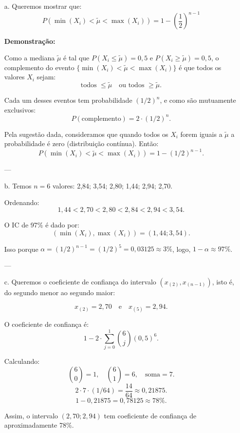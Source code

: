 \documentclass[12pt]{article}
\begin{document}
\begin{enumerate}
    \item[a.] Queremos mostrar que:
    \[
    P(\min(X_i) < \tilde{\mu} < \max(X_i)) = 1 - \left(\frac12\right)^{n-1}
    \]
    
    \textbf{Demonstração:}
    
    Como a mediana \(\tilde{\mu}\) é tal que \(P(X_i \leq \tilde{\mu})=0,5\) e \(P(X_i \geq \tilde{\mu})=0,5\), o complemento do evento \(\{\min(X_i) < \tilde{\mu} < \max(X_i)\}\) é que todos os valores \(X_i\) sejam:
    \[
    \text{todos } \leq \tilde{\mu} \quad \text{ou todos } \geq \tilde{\mu}.
    \]
    
    Cada um desses eventos tem probabilidade \((1/2)^n\), e como são mutuamente exclusivos:
    \[
    P(\text{complemento}) = 2 \cdot (1/2)^n.
    \]
    
    Pela sugestão dada, consideramos que quando todos os \(X_i\) forem iguais a \(\tilde{\mu}\) a probabilidade é zero (distribuição contínua). Então:
    \[
    P(\min(X_i) < \tilde{\mu} < \max(X_i)) = 1 - (1/2)^{n-1}.
    \]
    
    ---
    
    \item[b.] Temos \(n=6\) valores: 2,84; 3,54; 2,80; 1,44; 2,94; 2,70.
    
    Ordenando:
    \[
    1,44 < 2,70 < 2,80 < 2,84 < 2,94 < 3,54.
    \]
    
    O IC de 97\% é dado por:
    \[
    (\min(X_i), \max(X_i)) = (1,44; 3,54).
    \]
    
    Isso porque \(\alpha = (1/2)^{n-1} = (1/2)^5 = 0,03125 \approx 3\%\), logo, \(1-\alpha \approx 97\%\).
    
    ---
    
    \item[c.] Queremos o coeficiente de confiança do intervalo \((x_{(2)}, x_{(n-1)})\), isto é, do segundo menor ao segundo maior:
    
    \[
    x_{(2)}=2,70 \quad\text{e}\quad x_{(5)}=2,94.
    \]
    
    O coeficiente de confiança é:
    \[
    1 - 2 \cdot \sum_{j=0}^{1} \binom{6}{j} (0,5)^6.
    \]
    
    Calculando:
    \[
    \binom{6}{0}=1,\quad \binom{6}{1}=6,\quad \text{soma}=7.
    \]
    \[
    2 \cdot 7 \cdot (1/64) = \frac{14}{64} \approx 0,21875.
    \]
    \[
    1 - 0,21875 = 0,78125 \approx 78\%.
    \]
    
    Assim, o intervalo \((2,70; 2,94)\) tem coeficiente de confiança de aproximadamente 78\%.
\end{enumerate}
\end{document}
